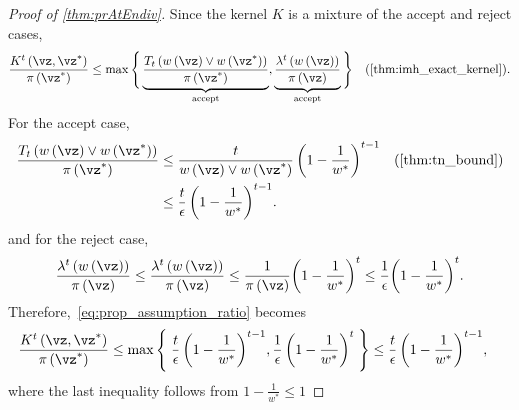 \prAtEndRestateiv*
\label{proofsection:prAtEndiv}\begin{proof}[Proof of \autoref{thm:prAtEndiv}]\label{proof:prAtEndiv}Since the kernel \(K\) is a mixture of the accept and reject cases, \begin {align} \frac {K^t\left (\vz , \vz ^*\right )}{\pi \left (\vz ^*\right )} &\leq \max \Bigg \{ \underbrace { \frac {T_t\left (w\left (\vz \right ) \vee w\left (\vz ^*\right )\right )}{\pi \left (\vz ^*\right )} }_{\text {accept}}, \underbrace { \frac {\lambda ^t\left (w\left (\vz \right )\right )}{\pi \left (\vz \right )} }_{\text {accept}} \Bigg \} &\text {(\cref {thm:imh_exact_kernel})}.\label {eq:prop_assumption_ratio} \end {align} For the accept case, \begin {align} \frac {T_t\left (w\left (\vz \right ) \vee w\left (\vz ^*\right )\right )}{\pi \left (\vz ^*\right )} &\leq \frac {t}{w\left (\vz \right ) \vee w\left (\vz ^*\right )} \, {\left (1 - \frac {1}{w^*}\right )}^{t-1} &\text {(\cref {thm:tn_bound})} \\ &\leq \frac {t}{\epsilon } \, {\left (1 - \frac {1}{w^*}\right )}^{t-1} . \end {align} and for the reject case, \begin {align} \frac {\lambda ^t\left (w\left (\vz \right )\right )}{\pi \left (\vz \right )} \leq \frac {\lambda ^t\left (w\left (\vz \right )\right )}{\pi \left (\vz \right )} \leq \frac {1}{\pi \left (\vz \right )} {\left (1 - \frac {1}{w^*}\right )}^{t} \leq \frac {1}{\epsilon } {\left (1 - \frac {1}{w^*}\right )}^{t}. \end {align} Therefore,~\cref {eq:prop_assumption_ratio} becomes \begin {align} \frac {K^t\left (\vz , \vz ^*\right )}{\pi \left (\vz ^*\right )} \leq \max \left \{\; \frac {t}{\epsilon } \, {\left (1 - \frac {1}{w^*}\right )}^{t-1}, \frac {1}{\epsilon } \, {\left (1-\frac {1}{w^*}\right )}^t \;\right \} &\leq \frac {t}{\epsilon } \, {\left (1 - \frac {1}{w^*}\right )}^{t-1}, \end {align} where the last inequality follows from \(1 - \frac {1}{w^*} \leq 1\)\end{proof}
\prAtEndRestatev*

